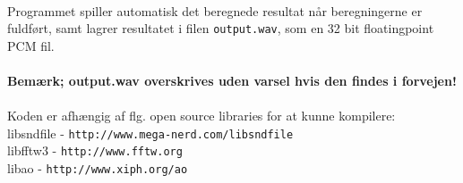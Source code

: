 \\
Programmet spiller automatisk det beregnede resultat når beregningerne
er fuldført, samt lagrer resultatet i filen \texttt{output.wav}, som en 32
bit floatingpoint PCM fil.\\
\\
\textbf{Bemærk; output.wav overskrives uden varsel hvis den findes i
  forvejen!}\\
\\
Koden er afhængig af flg. open source libraries for at kunne kompilere:\\
libsndfile - \texttt{http://www.mega-nerd.com/libsndfile}\\
libfftw3 - \texttt{http://www.fftw.org}\\
libao - \texttt{http://www.xiph.org/ao}
